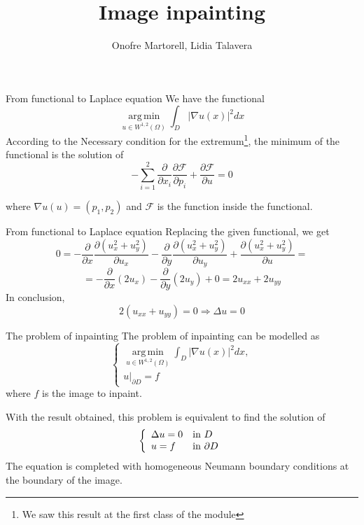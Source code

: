 \documentclass[11pt]{beamer}
\author{Onofre Martorell, Lidia Talavera}
\title{Image inpainting}
\DeclareMathOperator{\argmin}{\mathrm{arg\, min}}
\begin{document}
\begin{frame}
\titlepage
\end{frame}


\begin{frame}{From functional to Laplace equation}
We have the functional
$$
\displaystyle\argmin\limits_{u\in W^{1,2}(\Omega)}\int _D |\nabla u(x)|^2dx
$$
According to the Necessary condition for the extremum\footnote{We saw this result at the first class of the module}, the minimum of the functional is the solution of
$$-\sum_{i=1}^2 \frac{\partial}{\partial x_i}\frac{\partial\mathcal{F}}{\partial p_i} + \frac{\partial\mathcal{F}}{\partial u} = 0$$

where $\nabla u(u) = (p_1, p_2)$ and $\mathcal{F}$ is the function inside the functional.
\end{frame}

\begin{frame}{From functional to Laplace equation}
Replacing the given functional, we get
$$ 0 = - \frac{\partial}{\partial x}\frac{\partial(u_x^2 + u_y^2)}{\partial u_x} - \frac{\partial}{\partial y}\frac{\partial(u_x^2 + u_y^2)}{\partial u_y} + \frac{\partial(u_x^2 + u_y^2)}{\partial u} = $$
$$ = - \frac{\partial}{\partial x}(2u_x) - \frac{\partial}{\partial y}(2u_y) + 0 = 2u_{xx} + 2u_{yy}$$
In conclusion,
$$2(u_{xx} + u_{yy})=0\Longrightarrow \Delta u = 0$$
\end{frame}

\begin{frame}{The problem of inpainting}
The problem of inpainting can be modelled as
$$
\begin{cases}
\displaystyle\argmin\limits_{u\in W^{1,2}(\Omega)}\int _D |\nabla u(x)|^2dx,\\
u|_{\partial D} = f
\end{cases}
$$
where $f$ is the image to inpaint.


With the result obtained, this problem is equivalent to find the solution of
$$\left\lbrace
\begin{array}{l l}

\Delta u = 0& \text{in }D \\
u = f & \text{in }\partial D

\end{array}\right.
$$
The equation is completed with homogeneous Neumann boundary
conditions at the boundary of the image.

\end{frame}
\end{document}
